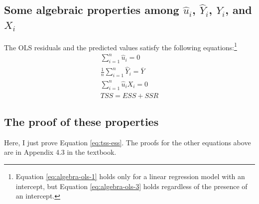 \documentclass[a4paper,11pt]{article}
\begin{document}
\subsection{Some algebraic properties among \(\hat{u}_i\), \(\hat{Y}_i\), \(Y_i\), and \(X_i\)}
\label{sec:org7a572a0}

The OLS residuals and the predicted values satisfy the following
equations:\footnote{Equation \ref{eq:algebra-ols-1} holds only for a
linear regression model with an intercept, but Equation
\ref{eq:algebra-ols-3} holds regardless of the presence of an intercept.}
\begin{gather}
\sum_{i=1}^n \hat{u}_i = 0 \label{eq:algebra-ols-1} \\
\frac{1}{n} \sum_{i=1}^n \hat{Y}_i = \bar{Y} \label{eq:algebra-ols-2} \\
\sum_{i=1}^n \hat{u}_i X_i = 0 \label{eq:algebra-ols-3} \\
TSS = ESS + SSR \label{eq:tss-ess}
\end{gather}

\subsection{The proof of these properties}
\label{sec:org6552fbc}

Here, I just prove Equation \ref{eq:tss-ess}. The proofs for the other
equations above are in Appendix 4.3 in the textbook.
\end{document}
